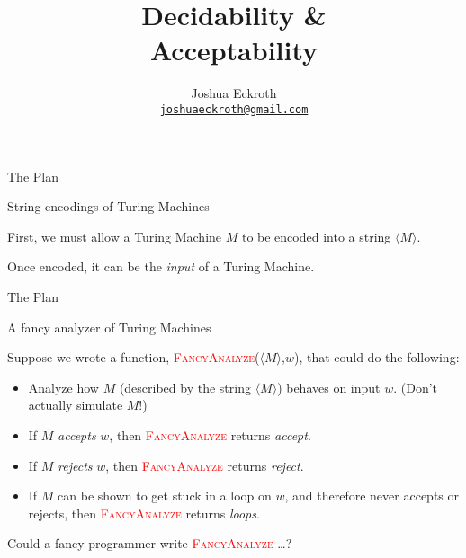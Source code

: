 \documentclass[12pt,compress]{beamer}
\title{Decidability \&\\Acceptability}
\author[Eckroth]
{Joshua Eckroth \\ \vskip 0.25in {\tt \href{mailto:joshuaeckroth@gmail.com}{joshuaeckroth@gmail.com}}}
\date{}
\newcommand{\func}[1]{\textcolor{red}{\textsc{#1}}}
\newcommand{\str}[1]{$\langle #1 \rangle$}
\begin{document}
\begin{frame}[plain]
  \titlepage
\end{frame}

\begin{frame}{The Plan}

  

\end{frame}

\begin{frame}{String encodings of Turing Machines}

  First, we must allow a Turing Machine $M$ to be encoded into a
  string \str{M}.

  \vskip 0.25in

  Once encoded, it can be the \textit{input} of a Turing Machine.

\end{frame}

\begin{frame}{The Plan}

  

\end{frame}

\begin{frame}{A fancy analyzer of Turing Machines}

  Suppose we wrote a function, \func{FancyAnalyze}(\str{M},$w$), that could do the
  following:

  \begin{itemize}

  \item Analyze how $M$ (described by the string \str{M})
    behaves on input $w$. (Don't actually simulate $M$!)

  \item If $M$ \textit{accepts} $w$, then \func{FancyAnalyze} returns \textit{accept}.

  \item If $M$ \textit{rejects} $w$, then \func{FancyAnalyze} returns \textit{reject}.

  \item If $M$ can be shown to get stuck in a loop on $w$, and therefore
    never accepts or rejects, then \func{FancyAnalyze} returns \textit{loops}.

  \end{itemize}

  Could a fancy programmer write \func{FancyAnalyze} \dots ?

\end{frame}
\end{document}
